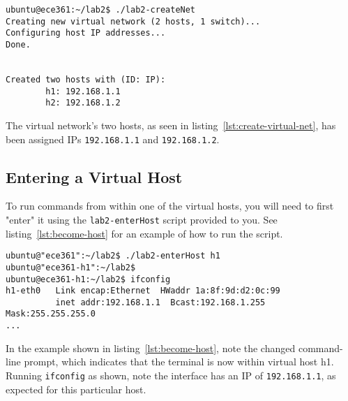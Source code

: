 \documentclass[11pt]{article}
\begin{document}
\begin{lstlisting}[style=ece361shell, caption={Creating the virtual network.}, label={lst:create-virtual-net}]
ubuntu@ece361:~/lab2$ ./lab2-createNet
Creating new virtual network (2 hosts, 1 switch)...
Configuring host IP addresses...
Done.


Created two hosts with (ID: IP):
        h1: 192.168.1.1
        h2: 192.168.1.2

\end{lstlisting}

The virtual network's two hosts, as seen in listing~\ref{lst:create-virtual-net}, has been assigned IPs \texttt{192.168.1.1} and \texttt{192.168.1.2}.

\subsection{Entering a Virtual Host}
To run commands from within one of the virtual hosts, you will need to first "enter" it using the \texttt{lab2-enterHost} script provided to you.
See listing~\ref{lst:become-host} for an example of how to run the script.

\begin{lstlisting}[style=ece361shell, caption={Entering into one of the virtual hosts.}, label={lst:become-host}]
ubuntu@"ece361":~/lab2$ ./lab2-enterHost h1
ubuntu@"ece361-h1":~/lab2$
ubuntu@ece361-h1:~/lab2$ ifconfig
h1-eth0   Link encap:Ethernet  HWaddr 1a:8f:9d:d2:0c:99
          inet addr:192.168.1.1  Bcast:192.168.1.255  Mask:255.255.255.0
...
\end{lstlisting}

In the example shown in listing~\ref{lst:become-host}, note the changed command-line prompt, which indicates that the terminal is now within virtual host h1.
Running \texttt{ifconfig} as shown, note the interface has an IP of \texttt{192.168.1.1}, as expected for this particular host.

\end{document}
